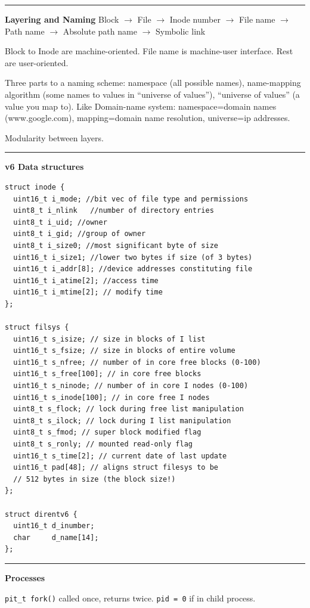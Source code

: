 \documentclass{article}
\begin{document}
\begin{multicols}{2}
  \noindent\rule{4cm}{0.4pt}

  {\bf Layering and Naming}
  Block $\rightarrow$ File $\rightarrow$ Inode number $\rightarrow$ File name
  $\rightarrow$ Path name $\rightarrow$ Absolute path name $\rightarrow$
  Symbolic link

  Block to Inode are machine-oriented. File name is machine-user interface. Rest
  are user-oriented.

  Three parts to a naming scheme: namespace (all possible names), name-mapping
  algorithm (some names to values in ``universe of values''), ``universe of
  values'' (a value you map to). Like Domain-name system: namespace=domain names
  (www.google.com), mapping=domain name resolution, universe=ip addresses.

  Modularity between layers. %

  \noindent\rule{4cm}{0.4pt}

  {\bf v6 Data structures}
  \begin{verbatim}
struct inode {
  uint16_t i_mode; //bit vec of file type and permissions
  uint8_t i_nlink	//number of directory entries
  uint8_t i_uid; //owner
  uint8_t i_gid; //group of owner
  uint8_t i_size0; //most significant byte of size
  uint16_t i_size1; //lower two bytes if size (of 3 bytes)
  uint16_t i_addr[8]; //device addresses constituting file
  uint16_t i_atime[2]; //access time
  uint16_t i_mtime[2]; // modify time
};

struct filsys {
  uint16_t s_isize; // size in blocks of I list
  uint16_t s_fsize; // size in blocks of entire volume
  uint16_t s_nfree; // number of in core free blocks (0-100)
  uint16_t s_free[100]; // in core free blocks
  uint16_t s_ninode; // number of in core I nodes (0-100)
  uint16_t s_inode[100]; // in core free I nodes
  uint8_t s_flock; // lock during free list manipulation
  uint8_t s_ilock; // lock during I list manipulation
  uint8_t s_fmod; // super block modified flag
  uint8_t s_ronly; // mounted read-only flag
  uint16_t s_time[2]; // current date of last update
  uint16_t pad[48]; // aligns struct filesys to be
  // 512 bytes in size (the block size!)
};

struct direntv6 {
  uint16_t d_inumber;
  char     d_name[14];
};
  \end{verbatim}

  \noindent\rule{4cm}{0.4pt}

  {\bf Processes}

  {\tt pit\_t fork()} called once, returns twice. {\tt pid = 0} if in child
  process.


\end{multicols}
\end{document}
